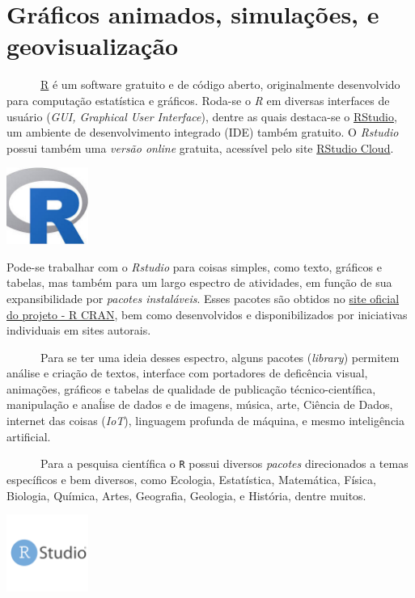 \documentclass[
  letterpaper,
  DIV=11,
  numbers=noendperiod]{scrreprt}
\begin{document}
\section{Gráficos animados, simulações, e
geovisualização}\label{gruxe1ficos-animados-simulauxe7uxf5es-e-geovisualizauxe7uxe3o}

~~~~~~\href{https://cran.r-project.org/}{R} é um software gratuito e de
código aberto, originalmente desenvolvido para computação estatística e
gráficos. Roda-se o \emph{R} em diversas interfaces de usuário
(\emph{GUI, Graphical User Interface}), dentre as quais destaca-se o
\href{https://www.rstudio.com/}{RStudio}, um ambiente de desenvolvimento
integrado (IDE) também gratuito. O \emph{Rstudio} possui também uma
\emph{versão online} gratuita, acessível pelo site
\href{https://rstudio.cloud/}{RStudio Cloud}.

\href{https://cran.r-project.org/}{\includegraphics[width=0.2\textwidth,height=\textheight]{rLogo.jpeg}}

Pode-se trabalhar com o \emph{Rstudio} para coisas simples, como texto,
gráficos e tabelas, mas também para um largo espectro de atividades, em
função de sua expansibilidade por \emph{pacotes instaláveis}. Esses
pacotes são obtidos no \href{https://cran.r-project.org}{site oficial do
projeto - R CRAN}, bem como desenvolvidos e disponibilizados por
iniciativas individuais em sites autorais.

~~~~~~Para se ter uma ideia desses espectro, alguns pacotes
(\emph{library}) permitem análise e criação de textos, interface com
portadores de deficência visual, animações, gráficos e tabelas de
qualidade de publicação técnico-científica, manipulação e anaĺise de
dados e de imagens, música, arte, Ciência de Dados, internet das coisas
(\emph{IoT}), linguagem profunda de máquina, e mesmo inteligência
artificial.

~~~~~~Para a pesquisa científica o \texttt{R} possui diversos
\emph{pacotes} direcionados a temas específicos e bem diversos, como
Ecologia, Estatística, Matemática, Física, Biologia, Química, Artes,
Geografia, Geologia, e História, dentre muitos.

\href{https://rstudio.cloud/}{\includegraphics[width=0.2\textwidth,height=\textheight]{RStudioLogo.png}}
\end{document}
